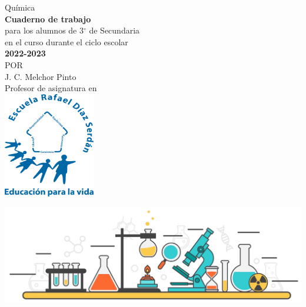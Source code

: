 \thispagestyle{empty}
\begin{center}
    \vspace{4cm}
    {\Huge Química}\\
    \vspace{1cm}
    \normalsize
    \textbf{\large Cuaderno de trabajo}\\
    para los alumnos de 3$^\circ$ de  Secundaria\\
    en el curso durante el ciclo escolar\\
    \textbf{2022-2023}\\
    \vspace{2cm}
    \small POR\\
    \Large J. C. Melchor Pinto\\[0.5em]
    \normalsize Profesor de asignatura en\\
    \vspace{2cm}
    \includegraphics[width=4cm]{../Images/LOGO_RDS_nobg}\\
    \vspace{1cm}
\end{center}
\includegraphics[width=\pdfpagewidth]{../Images/cover_bg}